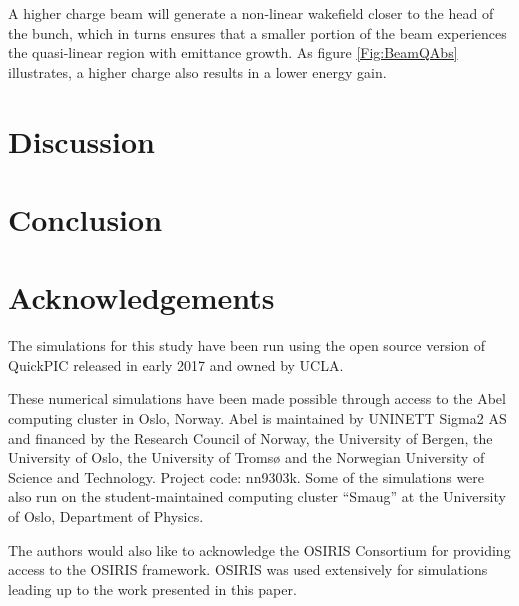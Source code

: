 \documentclass[aps,prstab,reprint,amsmath,amssymb,groupedaddress]{revtex4-1}
\begin{document}
A higher charge beam will generate a non-linear wakefield closer to the head of the bunch, which in turns ensures that a
smaller portion of the beam experiences the quasi-linear region with emittance growth. As figure \ref{Fig:BeamQAbs}
illustrates, a higher charge also results in a lower energy gain.

\section[\label{S:D}]{Discussion}


\section[\label{S:C}]{Conclusion}

\section[\label{Ack}]{Acknowledgements}

The simulations for this study have been run using the open source version of QuickPIC released in early 2017 and owned
by UCLA.

These numerical simulations have been made possible through access to the Abel computing cluster in Oslo, Norway. Abel
is maintained by UNINETT Sigma2 AS and financed by the Research Council of Norway, the University of Bergen, the
University of Oslo, the University of Tromsø and the Norwegian University of Science and Technology. Project code:
nn9303k. Some of the simulations were also run on the student-maintained computing cluster ``Smaug'' at the University
of Oslo, Department of Physics.

The authors would also like to acknowledge the OSIRIS Consortium for providing access to the OSIRIS framework. OSIRIS
was used extensively for simulations leading up to the work presented in this paper.


\end{document}
